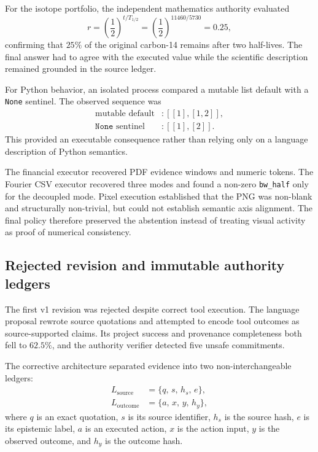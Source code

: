 For the isotope portfolio, the independent mathematics authority evaluated
\begin{equation}
r = \left(\frac{1}{2}\right)^{t/T_{1/2}}
  = \left(\frac{1}{2}\right)^{11460/5730}
  = 0.25,
\label{eq:carbon14-decay}
\end{equation}
confirming that $25\%$ of the original carbon-14 remains after two half-lives.
The final answer had to agree with the executed value while the scientific
description remained grounded in the source ledger.

For Python behavior, an isolated process compared a mutable list default with
a \texttt{None} sentinel.  The observed sequence was
\begin{equation}
\begin{aligned}
\text{mutable default} &: [[1],[1,2]],\\
\texttt{None}\text{ sentinel} &: [[1],[2]].
\end{aligned}
\label{eq:python-default-observation}
\end{equation}
This provided an executable consequence rather than relying only on a language
description of Python semantics.

The financial executor recovered PDF evidence windows and numeric tokens.  The
Fourier CSV executor recovered three modes and found a non-zero
\texttt{bw\_half} only for the decoupled mode.  Pixel execution established
that the PNG was non-blank and structurally non-trivial, but could not establish
semantic axis alignment.  The final policy therefore preserved the abstention
instead of treating visual activity as proof of numerical consistency.


\subsection{Rejected revision and immutable authority ledgers}
\label{subsec:arena-v1-authority-ledgers}

The first v1 revision was rejected despite correct tool execution.  The
language proposal rewrote source quotations and attempted to encode tool
outcomes as source-supported claims.  Its project success and provenance
completeness both fell to $62.5\%$, and the authority verifier detected five
unsafe commitments.

The corrective architecture separated evidence into two non-interchangeable
ledgers:
\begin{equation}
\begin{aligned}
L_{\mathrm{source}}
 &= \{q,\,s,\,h_s,\,e\},\\
L_{\mathrm{outcome}}
 &= \{a,\,x,\,y,\,h_y\},
\end{aligned}
\label{eq:dual-authority-ledgers}
\end{equation}
where $q$ is an exact quotation, $s$ is its source identifier, $h_s$ is the
source hash, $e$ is its epistemic label, $a$ is an executed action, $x$ is the
action input, $y$ is the observed outcome, and $h_y$ is the outcome hash.

